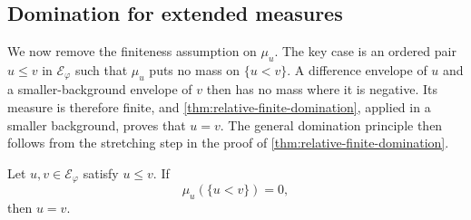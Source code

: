 \subsection{Domination for extended measures}

We now remove the finiteness assumption on $\mu_u$. The key case is an ordered pair $u\leq v$ in $\mathcal E_\varphi$ such that $\mu_u$ puts no mass on $\{u<v\}$. A difference envelope of $u$ and a smaller-background envelope of $v$ then has no mass where it is negative. Its measure is therefore finite, and \cref{thm:relative-finite-domination}, applied in a smaller background, proves that $u=v$. The general domination principle then follows from the stretching step in the proof of \cref{thm:relative-finite-domination}.

\begin{lemma}\label{lem:relative-zero-domination}
Let $u,v\in\mathcal E_\varphi$ satisfy $u\leq v$. If
\[
 \mu_u(\{u<v\})=0,
\]
then $u=v$.
\end{lemma}
